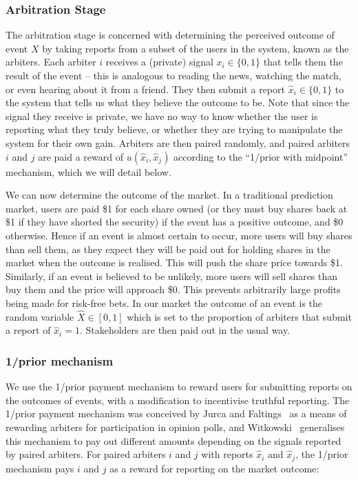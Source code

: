 \documentclass[10pt,a4paper]{article}
\theoremstyle{plain}
\theoremstyle{definition}
\begin{document}
\subsubsection{Arbitration Stage}

The arbitration stage is concerned with determining the perceived outcome of
event $X$ by taking reports from a subset of the users in the system, known as
the arbiters. Each arbiter $i$ receives a (private) signal $x_i \in \{0,1\}$
that tells them the result of the event -- this is analogous to reading the
news, watching the match, or even hearing about it from a friend. They then
submit a report $\hat{x}_i \in \{0,1\}$ to the system that tells us what they
believe the outcome to be. Note that since the signal they receive is private,
we have no way to know whether the user is reporting what they truly believe,
or whether they are trying to manipulate the system for their own gain.
Arbiters are then paired randomly, and paired arbiters $i$ and $j$ are paid a
reward of $u(\hat{x}_i, \hat{x}_j)$ according to the ``1/prior with midpoint''
mechanism, which we will detail below.

We can now determine the outcome of the market. In a traditional prediction
market, users are paid \$1 for each share owned (or they must buy shares back
at \$1 if they have shorted the security) if the event has a positive outcome,
and \$0 otherwise. Hence if an event is almost certain to occur, more users
will buy shares than sell them, as they expect they will be paid out for
holding shares in the market when the outcome is realised. This will push the
share price towards \$1. Similarly, if an event is believed to be unlikely,
more users will sell shares than buy them and the price will approach \$0. This
prevents arbitrarily large profits being made for risk-free bets. In our market
the outcome of an event is the random variable $\hat{X} \in [0,1]$ which is set
to the proportion of arbiters that submit a report of $\hat{x}_i=1$.
Stakeholders are then paid out in the usual way.

\subsubsection{1/prior mechanism}

\label{sec:oneOverPrior}

We use the 1/prior payment mechanism to reward users for submitting reports on
the outcomes of events, with a modification to incentivise truthful reporting.
The 1/prior payment mechanism was conceived by Jurca and
Faltings~\cite{JurcaFaltings2008, JurcaFaltings2011} as a means of rewarding
arbiters for participation in opinion polls, and Witkowski~\cite{Witkowski2014}
generalises this mechanism to pay out different amounts depending on the
signals reported by paired arbiters. For paired arbiters $i$ and $j$ with
reports $\hat{x}_i$ and $\hat{x}_j$, the 1/prior mechanism pays $i$ and $j$ as
a reward for reporting on the market outcome:
\end{document}
